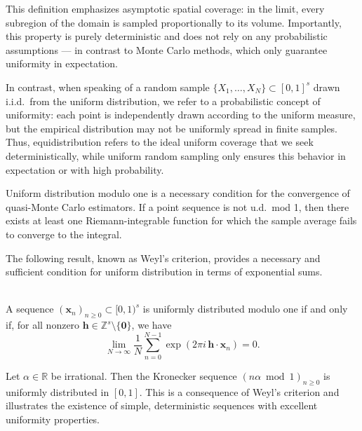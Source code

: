 This definition emphasizes asymptotic spatial coverage: in the limit, every
subregion of the domain is sampled proportionally to its volume. Importantly,
this property is purely deterministic and does not rely on any probabilistic
assumptions — in contrast to Monte Carlo methods, which only guarantee
uniformity in expectation.

In contrast, when speaking of a random sample $\{X_1, \dots, X_N\} \subset [0,1]^s$ drawn i.i.d.\ from the uniform distribution, we refer to a probabilistic concept of uniformity: each point is independently drawn according to the uniform measure, but the empirical distribution may not be uniformly spread in finite samples. Thus, equidistribution refers to the ideal uniform coverage that we seek deterministically, while uniform random sampling only ensures this behavior in expectation or with high probability.

\begin{remark}
Uniform distribution modulo one is a necessary condition for the convergence of quasi-Monte Carlo estimators. If a point sequence is not u.d.\ mod 1, then there exists at least one Riemann-integrable function for which the sample average fails to converge to the integral.
\end{remark}

The following result, known as Weyl’s criterion, provides a necessary and sufficient condition for uniform distribution in terms of exponential sums.

\begin{theorem} \ \\
A sequence $(\boldsymbol{x}_n)_{n \geq 0} \subset [0,1)^s$ is uniformly distributed modulo one if and only if, for all nonzero $\boldsymbol{h} \in \mathbb{Z}^s \setminus \{\boldsymbol{0}\}$, we have
\begin{equation*}
    \lim_{N \to \infty} \frac{1}{N} \sum_{n=0}^{N-1} \exp(2\pi i\, \boldsymbol{h} \cdot \boldsymbol{x}_n) = 0.
\end{equation*}
\end{theorem}

\begin{example}
Let $\alpha \in \mathbb{R}$ be irrational. Then the Kronecker sequence $(n \alpha \bmod 1)_{n \geq 0}$ is uniformly distributed in $[0,1]$. This is a consequence of Weyl’s criterion and illustrates the existence of simple, deterministic sequences with excellent uniformity properties.
\end{example}

